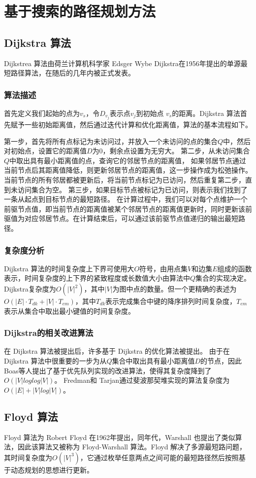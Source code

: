 \documentclass{standalone}
\begin{document}
\chapter{基于搜索的路径规划方法}
\section{Dijkstra 算法}
Dijkstrea 算法由荷兰计算机科学家 Edsger Wybe Dijkstra在1956年提出的单源最短路径算法，在随后的几年内被正式发表。
\subsection{算法描述}
首先定义我们起始的点为$v_s$，令$D_{v_j}$表示点$v_j$到初始点 $v_s$的距离。Dijkstra 算法首先赋予一些初始距离值，然后通过迭代计算和优化距离值，算法的基本流程如下。\par
第一步，首先将所有点标记为未访问过，并放入一个未访问的点的集合$Q$中，然后对初始点，设置它的距离值$D$为0，剩余点设置为无穷大。
第二步，从未访问集合$Q$中取出具有最小距离值的点，查询它的邻居节点的距离值，
如果邻居节点通过当前节点后其距离值降低，则更新邻居节点的距离值，这一步操作成为松弛操作。当前节点的所有邻居都被更新后，将当前节点标记为已访问，然后重复第二步，直到未访问集合为空。
第三步，如果目标节点被标记为已访问，则表示我们找到了一条从起点到目标节点的最短路径。
在计算过程中，我们可以对每个点维护一个前驱节点值，即当前节点的距离值被某个邻居节点的距离值更新时，同时更新该前驱值为对应邻居节点。在计算结束后，可以通过该前驱节点值递归的输出最短路径。
\subsection{复杂度分析}
Dijkstra 算法的时间复杂度上下界可使用大$O$符号，由用点集$V$和边集$E$组成的函数表示，时间复杂度的上下界的紧致程度或长数值大小由算法中$Q$集合的实现决定。Dijkstra复杂度为$O(|V|^2)$，其中$|V|$为图中点的数量。但一个更精确的表述为 $O(|E|\cdot T_{dk} + |V|\cdot T_{em})$，其中$T_{dk}$表示完成集合中键的降序排列时间复杂度，$T_{em}$表示从集合中取出最小键值的时间复杂度。
\subsection{Dijkstra的相关改进算法}
在 Dijkstra 算法被提出后，许多基于 Dijkstra 的优化算法被提出。
由于在 Dijkstra 算法中很重要的一步为从$Q$集合中取出具有最小距离值$D$的节点，因此Boas等人提出了基于优先队列实现的改进算法，使得其复杂度降到了$O(|V|loglog|V|)$。
Fredman和 Tarjan通过斐波那契堆实现的算法复杂度为$O(|E| + |V|log|V|)$。
\section{Floyd 算法}
Floyd 算法为 Robert Floyd 在1962年提出，同年代，Warshall 也提出了类似算法，因此该算法又被称为 Floyd-Warshall 算法。Floyd 解决了多源最短路问题，其时间复杂度为$O(|V|^3)$，它通过枚举任意两点之间可能的最短路径然后按照基于动态规划的思想进行更新。
\end{document}
